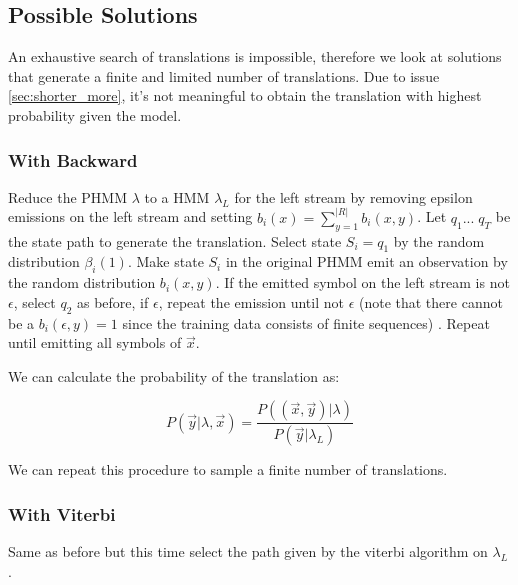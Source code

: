 \documentclass[a4paper,10pt]{article}
\begin{document}
\subsection{Possible Solutions}

An exhaustive search of translations is impossible, therefore we look at
solutions that generate a finite and limited number of translations. Due to
issue \ref{sec:shorter_more}, it's not meaningful to obtain the translation with
highest probability given the model.

\subsubsection{With Backward}

Reduce the PHMM $\lambda$ to a HMM $\lambda_{L}$ for the left stream by removing
epsilon emissions on the left stream and setting $b_i(x) =
\displaystyle\sum_{y=1}^{|R|} b_i(x, y)$. Let $q_1 ... \; q_T$ be the state path
to generate the translation. Select state $S_i = q_1$ by the random distribution
$\beta_i(1)$. Make state $S_i$ in the original PHMM emit an observation by the
random distribution $b_i(x, y)$. If the emitted symbol on the left stream is not
$\epsilon$, select $q_2$ as before, if $\epsilon$, repeat the emission until not
$\epsilon$ (note that there cannot be a $b_i(\epsilon, y) = 1$ since the
training data consists of finite sequences) . Repeat until emitting all symbols
of $\vec{x}$.

We can calculate the probability of the translation as:

$$P(\vec{y}|\lambda, \vec{x}) = \frac{P((\vec{x},
  \vec{y})|\lambda)}{P(\vec{y}|\lambda_L)}$$

We can repeat this procedure to sample a finite number of translations.

\subsubsection{With Viterbi}

Same as before but this time select the path given by the viterbi algorithm on
$\lambda_L$.




{\small

}
\end{document}
